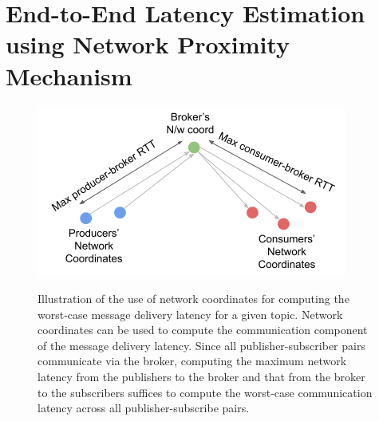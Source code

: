 \section{End-to-End Latency Estimation using Network Proximity Mechanism}
\begin{figure}[h]
\centering
\includegraphics[width=0.75\columnwidth]{figures/epulsar/nw_coord_latency.png}
\label{fig:nw_coord_latency}
\caption{Illustration of the use of network coordinates for computing the worst-case message delivery latency for a given topic. Network coordinates can be used to compute the communication component of the message delivery latency. Since all publisher-subscriber pairs communicate via the broker, computing the maximum network latency from the publishers to the broker and that from the broker to the subscribers suffices to compute the worst-case communication latency across all publisher-subscribe pairs.}
\end{figure}

